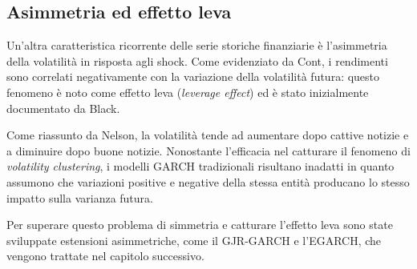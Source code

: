 \subsection{Asimmetria ed effetto leva}
Un'altra caratteristica ricorrente delle serie storiche finanziarie è l'asimmetria della volatilità in risposta agli shock. 
Come evidenziato da Cont\cite{cont:empirical}, i rendimenti sono correlati negativamente con la variazione della volatilità futura: 
questo fenomeno è noto come effetto leva (\emph{leverage effect}) ed è stato inizialmente documentato da Black\cite{black:studies}.

Come riassunto da Nelson\cite{nelson:conditional}, la volatilità tende ad aumentare dopo cattive notizie e a diminuire dopo buone notizie. 
Nonostante l'efficacia nel catturare il fenomeno di \emph{volatility clustering}, i modelli GARCH tradizionali risultano inadatti in quanto 
assumono che variazioni positive e negative della stessa entità producano lo stesso impatto sulla varianza futura\cite{tsay:analysis}.

Per superare questo problema di simmetria e catturare l'effetto leva sono state sviluppate estensioni asimmetriche, come il GJR-GARCH e 
l'EGARCH, che vengono trattate nel capitolo successivo.